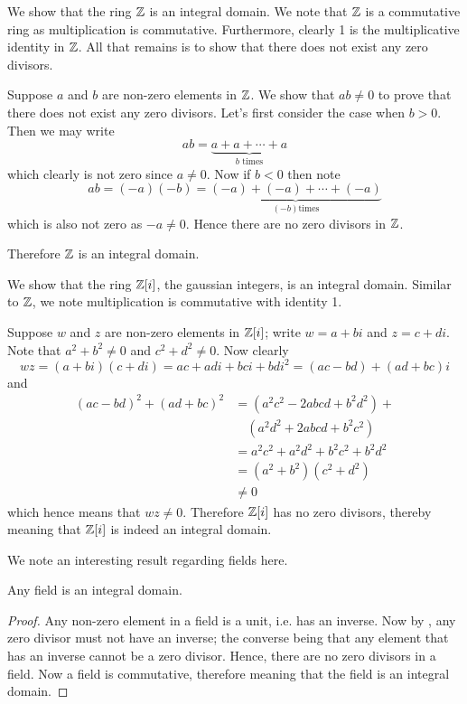 \begin{example}
    We show that the ring $\mathbb{Z}$ is an integral domain. We note that $\mathbb{Z}$ is a commutative ring as multiplication is commutative. Furthermore, clearly 1 is the multiplicative identity in $\mathbb{Z}$. All that remains is to show that there does not exist any zero divisors.

    Suppose $a$ and $b$ are non-zero elements in $\mathbb{Z}$. We show that $ab \neq 0$ to prove that there does not exist any zero divisors. Let's first consider the case when $b > 0$. Then we may write
    \[
        ab = \underbrace{a + a + \cdots + a}_{b \text{ times}}
    \]
    which clearly is not zero since $a \neq 0$. Now if $b < 0$ then note
    \[
        ab = (-a)(-b) = \underbrace{(-a) + (-a) + \cdots + (-a)}_{(-b) \text{times}}
    \]
    which is also not zero as $-a \neq 0$. Hence there are no zero divisors in $\mathbb{Z}$.

    Therefore $\mathbb{Z}$ is an integral domain.
\end{example}
\begin{example}
    We show that the ring $\mathbb{Z}[i]$, the gaussian integers, is an integral domain. Similar to $\mathbb{Z}$, we note multiplication is commutative with identity 1.

    Suppose $w$ and $z$ are non-zero elements in $\mathbb{Z}[i]$; write $w = a+bi$ and $z = c+di$. Note that $a^2+b^2 \neq 0$ and $c^2 + d^2 \neq 0$. Now clearly
    \[
        wz = (a+bi)(c+di) = ac+adi+bci+bdi^2 = (ac-bd) + (ad+bc)i
    \]
    and
    \begin{align*}
        (ac-bd)^2 + (ad+bc)^2 &= (a^2c^2 - 2abcd + b^2d^2) +\\
        &\quad(a^2d^2 + 2abcd + b^2c^2)\\
        &= a^2c^2 + a^2d^2 + b^2c^2 + b^2d^2\\
        &= (a^2 + b^2)(c^2 + d^2)\\
        &\neq 0
    \end{align*}
    which hence means that $wz \neq 0$. Therefore $\mathbb{Z}[i]$ has no zero divisors, thereby meaning that $\mathbb{Z}[i]$ is indeed an integral domain.
\end{example}

We note an interesting result regarding fields here.
\begin{proposition}\label{prop-field-is-integral-domain}
    Any field is an integral domain.
\end{proposition}
\begin{proof}
    Any non-zero element in a field is a unit, i.e. has an inverse. Now by , any zero divisor must not have an inverse; the converse being that any element that has an inverse cannot be a zero divisor. Hence, there are no zero divisors in a field. Now a field is commutative, therefore meaning that the field is an integral domain.
\end{proof}

